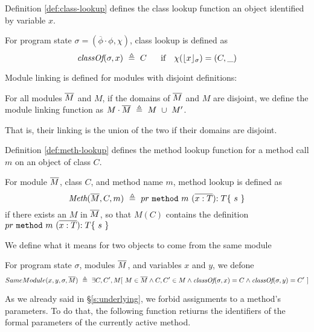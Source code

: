 Definition \ref{def:class-lookup} defines the class lookup function an object 
identified by variable $x$.
\begin{definition}
\label{def:class-lookup}
For program state $\sigma = ({\overline {\phi}}\cdot\phi, \chi)$, class lookup is defined as 
$$\class{\sigma}{x}\ \triangleq\ C \ \ \ \ \ \mbox{if} \ \ \  \chi(\interpret{\sigma}{x})=(C,\_ )$$
\end{definition}

Module linking is defined for modules with disjoint definitions:

\begin{definition}
\label{def:linking}
For all modules $\overline{M}$ and $M$, if the domains of $\overline{M}$ and $M$ are disjoint, 
we define the module linking function as $M\cdot \overline{M}\ \triangleq\ M\ \cup\ M'$.
\end{definition}
That is,  their linking is the union of the two if their domains are disjoint.

Definition \ref{def:meth-lookup} defines the method lookup function for a method
call $m$ on an object of class $C$.
\begin{definition}
\label{def:meth-lookup}
For module $\overline{M}$, class $C$, and method name $m$, method lookup is defined as 
$$\textit{Meth}(\overline{M}, C, m)\ \triangleq\ { pr}\  \mbox{\normalfont{\texttt{method}}}\ m\ (\overline{x : T}) {:T}\{\ s\ \}  $$
if there exists an $M$ in $\overline{M}$, so that $M(C)$ contains the definition ${ pr}\  \prg{method}\ m\ (\overline{x : T}) {:T}\{\ s\ \} $
\end{definition}





We define what it means for two objects to come from the same module
\begin{definition}
\label{def:same:module}
For program state $\sigma$,  modules $\overline{M}$, and variables $x$ and $y$, we defone
$$\Same {x} {y} {\sigma}{\Mtwo}\ \triangleq\ \exists C, C', M[ \ M\in \Mtwo \wedge C, C'\in M \wedge  \class{\sigma}{x}=C \wedge \class{\sigma}{y} =C'\ ]$$
\end{definition}

As we already said in \S \ref{s:underlying}, we forbid assignments to a method's parameters. 
To do that, the following function retiurns the  identifiers of the formal parameters of the currently active method.



